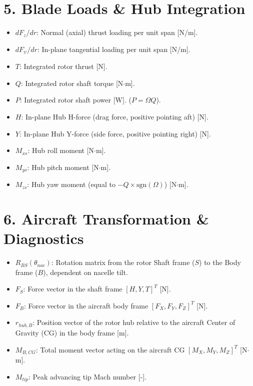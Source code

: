 \documentclass{article}
\begin{document}
\section*{5. Blade Loads \& Hub Integration}
\begin{itemize}
    \item $dF_z/dr$: Normal (axial) thrust loading per unit span [N/m].
    \item $dF_\psi/dr$: In-plane tangential loading per unit span [N/m].
    \item $T$: Integrated rotor thrust [N].
    \item $Q$: Integrated rotor shaft torque [N$\cdot$m].
    \item $P$: Integrated rotor shaft power [W]. ($P = \Omega Q$).
    \item $H$: In-plane Hub H-force (drag force, positive pointing aft) [N].
    \item $Y$: In-plane Hub Y-force (side force, positive pointing right) [N].
    \item $M_{xs}$: Hub roll moment [N$\cdot$m].
    \item $M_{ys}$: Hub pitch moment [N$\cdot$m].
    \item $M_{zs}$: Hub yaw moment (equal to $-Q \times \text{sgn}(\Omega)$) [N$\cdot$m].
\end{itemize}

\section*{6. Aircraft Transformation \& Diagnostics}
\begin{itemize}
    \item $R_{BS}(\theta_{nac})$: Rotation matrix from the rotor Shaft frame ($S$) to the Body frame ($B$), dependent on nacelle tilt.
    \item $F_S$: Force vector in the shaft frame $[H, Y, T]^T$ [N].
    \item $F_B$: Force vector in the aircraft body frame $[F_X, F_Y, F_Z]^T$ [N].
    \item $r_{hub,B}$: Position vector of the rotor hub relative to the aircraft Center of Gravity (CG) in the body frame [m].
    \item $M_{B,CG}$: Total moment vector acting on the aircraft CG $[M_X, M_Y, M_Z]^T$ [N$\cdot$m].
    \item $M_{tip}$: Peak advancing tip Mach number [-].
\end{itemize}
\end{document}
